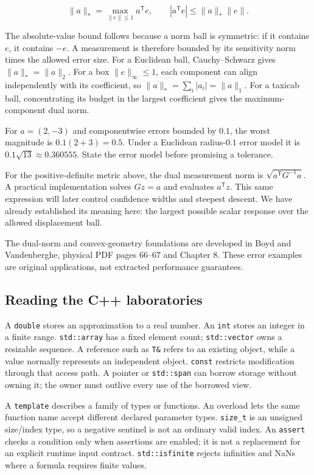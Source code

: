 \[
\|a\|_* = \max_{\|e\|\le1} a^{\mathsf T}e,
\qquad |a^{\mathsf T}e|\le\|a\|_*\|e\|.
\]

The absolute-value bound follows because a norm ball is symmetric: if it contains \(e\), it contains \(-e\). A measurement is therefore bounded by its sensitivity norm times the allowed error size. For a Euclidean ball, Cauchy--Schwarz gives \(\|a\|_* =\|a\|_2\). For a box \(\|e\|_\infty\le1\), each component can align independently with its coefficient, so \(\|a\|_* =\sum_i|a_i|=\|a\|_1\). For a taxicab ball, concentrating its budget in the largest coefficient gives the maximum-component dual norm.

For \(a=(2,-3)\) and componentwise errors bounded by \(0.1\), the worst magnitude is \(0.1(2+3)=0.5\). Under a Euclidean radius-\(0.1\) error model it is \(0.1\sqrt{13}\approx0.360555\). State the error model before promising a tolerance.

For the positive-definite metric above, the dual measurement norm is \(\sqrt{a^{\mathsf T}G^{-1}a}\). A practical implementation solves \(Gz=a\) and evaluates \(a^{\mathsf T}z\). This same expression will later control confidence widths and steepest descent. We have already established its meaning here: the largest possible scalar response over the allowed displacement ball.

The dual-norm and convex-geometry foundations are developed in Boyd and Vandenberghe, physical PDF pages 66--67 and Chapter 8. These error examples are original applications, not extracted performance guarantees.

\subsection{Reading the C++ laboratories}\label{01-foundations-i-ch017-reading-the-c-laboratories}

A \texttt{double} stores an approximation to a real number. An \texttt{int} stores an integer in a finite range. \texttt{std::array} has a fixed element count; \texttt{std::vector} owns a resizable sequence. A reference such as \texttt{T\&} refers to an existing object, while a value normally represents an independent object. \texttt{const} restricts modification through that access path. A pointer or \texttt{std::span} can borrow storage without owning it; the owner must outlive every use of the borrowed view.

A \texttt{template} describes a family of types or functions. An overload lets the same function name accept different declared parameter types. \texttt{size\_t} is an unsigned size/index type, so a negative sentinel is not an ordinary valid index. An \texttt{assert} checks a condition only when assertions are enabled; it is not a replacement for an explicit runtime input contract. \texttt{std::isfinite} rejects infinities and NaNs where a formula requires finite values.


